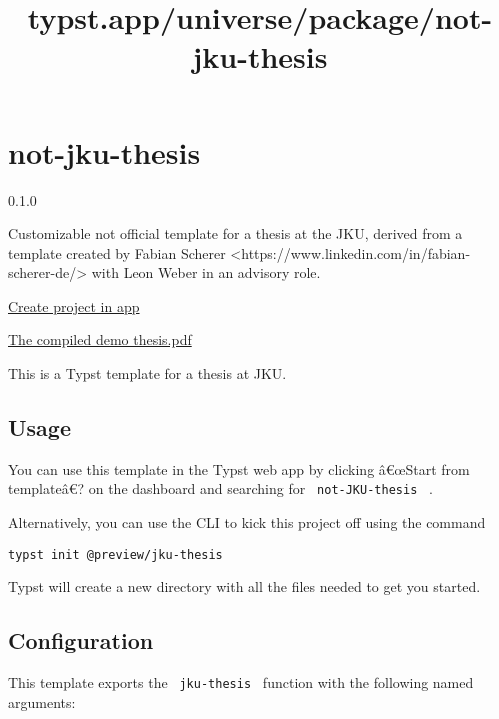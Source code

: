 \title{typst.app/universe/package/not-jku-thesis}

\label{banner}
\label{template-thumbnail}

\section{not-jku-thesis}\label{not-jku-thesis}

{ 0.1.0 }

Customizable not official template for a thesis at the JKU, derived from
a template created by Fabian Scherer
\textless https://www.linkedin.com/in/fabian-scherer-de/\textgreater{}
with Leon Weber in an advisory role.

\href{/app?template=not-jku-thesis&version=0.1.0}{Create project in app}

\label{readme}
\href{https://github.com/typst/packages/raw/main/packages/preview/not-jku-thesis/0.1.0/template/thesis.pdf}{The
compiled demo thesis.pdf}

This is a Typst template for a thesis at JKU.

\subsection{Usage}\label{usage}

You can use this template in the Typst web app by clicking â€œStart from
templateâ€? on the dashboard and searching for
\texttt{\ not-JKU-thesis\ } .

Alternatively, you can use the CLI to kick this project off using the
command

\begin{verbatim}
typst init @preview/jku-thesis
\end{verbatim}

Typst will create a new directory with all the files needed to get you
started.

\subsection{Configuration}\label{configuration}

This template exports the \texttt{\ jku-thesis\ } function with the
following named arguments:


